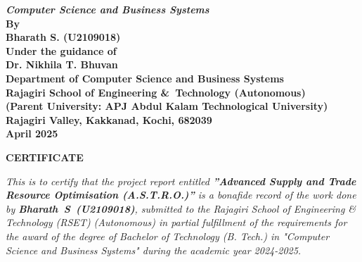 \begin{center}
	{\Large \bf \itshape{{Computer Science and Business Systems}}}\\[0.7cm]
	\large \bfseries{By}\\[.1cm]
	\large \bfseries{Bharath S. (U2109018)}\\[0.2cm]
	\large \bfseries{Under the guidance of}\\[0.3cm]
	\large \bfseries{Dr. Nikhila T. Bhuvan}\\[0.2cm]
	\large \textbf{Department of Computer Science and Business Systems}\\
	\large \textbf{Rajagiri School of Engineering \&\ Technology (Autonomous)}\\
	\small \bfseries{(Parent University: APJ Abdul Kalam Technological University)}\\
	\large \textbf{Rajagiri Valley, Kakkanad, Kochi, 682039}\\[0.2cm]
	\large \bfseries{April 2025}
\end{center}

\newpage
\thispagestyle{empty}
\vspace{1cm}
\begin{center}

	\large \bfseries{\huge{CERTIFICATE}}\\[1cm]
\end{center}

\renewcommand{\baselinestretch}{1.2}\normalsize

\sloppy
\emph{This is to certify that the project report entitled \textbf{”Advanced Supply and Trade Resource Optimisation (A.S.T.R.O.)”} is a bonafide record of the work done by \textbf{\mbox{Bharath S (U2109018)}}, submitted to the Rajagiri School of Engineering \& Technology (RSET) (Autonomous) in partial fulfillment of the requirements for the award of the degree of Bachelor of Technology (B. Tech.) in "Computer Science and Business Systems" during the academic year 2024-2025.}\\[2.5cm]

